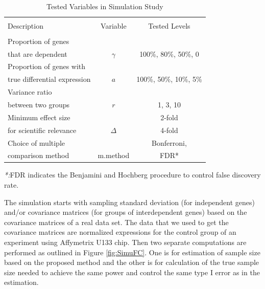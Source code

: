 \documentclass{bioinfo}
\begin{document}
\begin{table}[h]\centering
  \caption{Tested Variables in Simulation Study}\ \\
  \begin{tabular}{lcc}
    \hline\hline
    \\
    Description & Variable & Tested Levels \\
    \\
    \hline\hline
    Proportion of genes & & \\
    that are dependent & $\gamma$ & 100\%, 80\%, 50\%, 0\\
    \hline
    Proportion of genes with & & \\
    true differential expression & $a$ & 100\%, 50\%,
    10\%, 5\% \\
    \hline
    Variance ratio &  &\\
    between two groups & $r$ & 1, 3, 10  \\
    \hline
    Minimum effect size  & &2-fold \\
    for scientific relevance & $\Delta$ & 4-fold \\
    \hline
    Choice of multiple  & & Bonferroni,  \\
    comparison method & m.method & FDR* \\
    \hline\hline
  \end{tabular}
  \emph{*:}FDR indicates the Benjamini and Hochberg procedure to control false discovery
  rate.
  \label{tb:SimuVariables}
\end{table}

The simulation starts with sampling standard deviation (for
independent genes) and/or covariance matrices (for groups of
interdependent genes) based on the covariance matrices of a real
data set. The data that we used to get the covariance matrices are
normalized expressions for the control group of an experiment
using Affymetrix U133 chip. Then two separate computations are
performed as outlined in Figure \ref{fig:SimuFC}. One is for
estimation of sample size based on the proposed method and the
other is for calculation of the true sample size needed to achieve
the same power and control the same type I error as in the
estimation.
\end{document}
